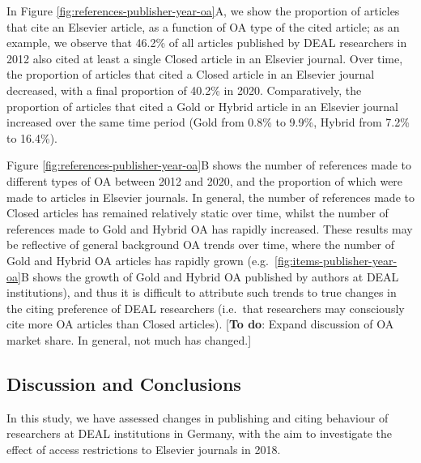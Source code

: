 \documentclass[
]{article}
\begin{document}
In Figure \ref{fig:references-publisher-year-oa}A, we show the proportion of articles that cite an Elsevier article, as a function of OA type of the cited article; as an example, we observe that 46.2\% of all articles published by DEAL researchers in 2012 also cited at least a single Closed article in an Elsevier journal. Over time, the proportion of articles that cited a Closed article in an Elsevier journal decreased, with a final proportion of 40.2\% in 2020. Comparatively, the proportion of articles that cited a Gold or Hybrid article in an Elsevier journal increased over the same time period (Gold from 0.8\% to 9.9\%, Hybrid from 7.2\% to 16.4\%).

Figure \ref{fig:references-publisher-year-oa}B shows the number of references made to different types of OA between 2012 and 2020, and the proportion of which were made to articles in Elsevier journals. In general, the number of references made to Closed articles has remained relatively static over time, whilst the number of references made to Gold and Hybrid OA has rapidly increased. These results may be reflective of general background OA trends over time, where the number of Gold and Hybrid OA articles has rapidly grown (e.g.~\ref{fig:items-publisher-year-oa}B shows the growth of Gold and Hybrid OA published by authors at DEAL institutions), and thus it is difficult to attribute such trends to true changes in the citing preference of DEAL researchers (i.e.~that researchers may consciously cite more OA articles than Closed articles). {[}\textbf{To do}: Expand discussion of OA market share. In general, not much has changed.{]}

\hypertarget{discussion-and-conclusions}{%
\subsection{Discussion and Conclusions}\label{discussion-and-conclusions}}

In this study, we have assessed changes in publishing and citing behaviour of researchers at DEAL institutions in Germany, with the aim to investigate the effect of access restrictions to Elsevier journals in 2018.
\end{document}
